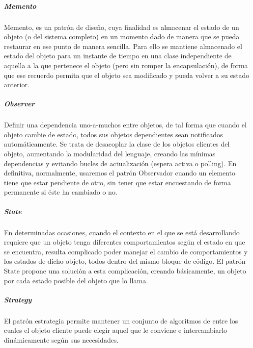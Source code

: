 \vspace*{\fill}
\noindent{}
\subparagraph{Memento}
Memento, es un patrón de diseño, cuya finalidad es almacenar el estado de un objeto (o del sistema completo) en un momento dado de manera que se pueda restaurar en ese punto de manera sencilla. Para ello se mantiene almacenado el estado del objeto para un instante de tiempo en una clase independiente de aquella a la que pertenece el objeto (pero sin romper la encapsulación), de forma que ese recuerdo permita que el objeto sea modificado y pueda volver a su estado anterior.\\
\vspace*{\fill}
\noindent{}
\subparagraph{Observer}
Definir una dependencia uno-a-muchos entre objetos, de tal forma que cuando el objeto cambie de estado, todos sus objetos dependientes sean notificados automáticamente. Se trata de desacoplar la clase de los objetos clientes del objeto, aumentando la modularidad del lenguaje, creando las mínimas dependencias y evitando bucles de actualización (espera activa o polling). En definitiva, normalmente, usaremos el patrón Observador cuando un elemento tiene que estar pendiente de otro, sin tener que estar encuestando de forma permanente si éste ha cambiado o no.\\
\vspace*{\fill}
\noindent{}
\subparagraph{State}
En determinadas ocasiones, cuando el contexto en el que se está desarrollando requiere que un objeto tenga diferentes comportamientos según el estado en que se encuentra, resulta complicado poder manejar el cambio de comportamientos y los estados de dicho objeto, todos dentro del mismo bloque de código. El patrón State propone una solución a esta complicación, creando básicamente, un objeto por cada estado posible del objeto que lo llama.\\
\vspace*{\fill}
\noindent{}
\subparagraph{Strategy}
El patrón estrategia permite mantener un conjunto de algoritmos de entre los cuales el objeto cliente puede elegir aquel que le conviene e intercambiarlo dinámicamente según sus necesidades.\\
\vspace*{\fill}
\noindent{}